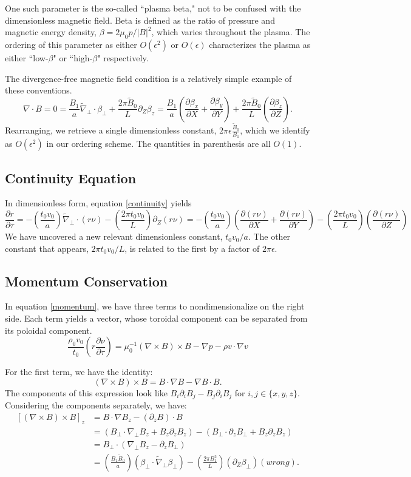\documentclass{article}
\newcommand{\ep}{\epsilon}
\newcommand{\np}{\nabla_\perp}
\newcommand{\p}{\partial}
\newcommand{\til}[1]{\widetilde{ #1 }}
\newcommand{\deriv}[2]{\frac{\p #1}{\p #2}}
\newcommand{\pth} [1] {\left( #1 \right) }
\begin{document}
One such parameter is the so-called ``plasma beta," not to be confused with the dimensionless magnetic field. Beta is defined as the ratio of pressure and magnetic energy density, $\beta = 2\mu_0p/|B|^2$, which varies throughout the plasma. The ordering of this parameter as either $O(\ep^2)$ or $O(\ep)$ characterizes the plasma as either ``low-$\beta$" or ``high-$\beta$" respectively. 

The divergence-free magnetic field condition is a relatively simple example of these conventions. 
$$\nabla\cdot B=0 = \frac{B_1}{a}\til{\nabla}_\perp \cdot\beta_\perp + \frac{2\pi\til{B}_0}{L}\p_Z\beta_z = \frac{B_1}{a}\pth{\deriv{\beta_x}{X} + \deriv{\beta_y}{Y}} + \frac{2\pi\til{B}_0}{L} \pth{\deriv{\beta_z}{Z}}.$$
Rearranging, we retrieve a single dimensionless constant, $2\pi\ep\frac{\til{B}_0}{B_1}$, which we identify as $O(\ep^2)$ in our ordering scheme. The quantities in parenthesis are all $O(1)$. 


\subsection{Continuity Equation}
In dimensionless form, equation \eqref{continuity} yields
\begin{equation} 
    \deriv{r}{\tau} = -\pth{\frac{t_0v_0}{a}} \til{\nabla}_\perp\cdot(r\nu) - \pth{\frac{2\pi t_0v_0}{L}} \p_Z(r\nu) 
    = -\pth{\frac{t_0v_0}{a}} \pth{\deriv{(r\nu)}{X} + \deriv{(r\nu)}{Y}} - \pth{\frac{2\pi t_0v_0}{L}} \pth{\deriv{(r\nu)}{Z}} 
\end{equation}
We have uncovered a new relevant dimensionless constant, $t_0v_0/a$. The other constant that appears, $2\pi t_0v_0/L$, is related to the first by a factor of $2\pi\ep$. 


\subsection{Momentum Conservation}
In equation \eqref{momentum}, we have three terms to nondimensionalize on the right side. Each term yields a vector, whose toroidal component can be separated from its poloidal component. 
$$\frac{\rho_0v_0}{t_0}\pth{r\deriv{\nu}{\tau}} = \mu_0^{-1}(\nabla\times B)\times B - \nabla p - \rho v\cdot\nabla v $$ 

For the first term, we have the identity: 
$$(\nabla\times B)\times B = B\cdot\nabla B - \nabla B\cdot B. $$
The components of this expression look like $B_i\p_iB_j - B_j\p_iB_j$ for $i,j\in\{x,y,z\}$. Considering the components separately, we have: 
\begin{equation} \begin{split}
    [(\nabla\times B)\times B]_z &= B\cdot\nabla B_z - (\p_zB)\cdot B \\
    &= (B_\perp\cdot\np B_z + B_z\p_zB_z) - (B_\perp\cdot \p_zB_\perp + B_z\p_zB_z) \\
    &= B_\perp\cdot(\np B_z - \p_zB_\perp) \\ 
    &= \pth{\frac{B_1 \til{B}_0}{a}} \pth{\beta_\perp \cdot \til{\nabla}_\perp\beta_\perp} - \pth{\frac{2\pi B_1^2}{L}} \pth{\p_Z\beta_\perp} (wrong). 
\end{split} \end{equation}
\end{document}
